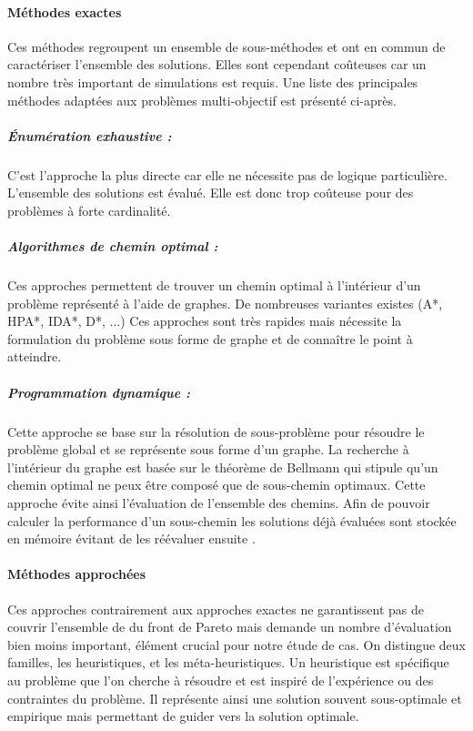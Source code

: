 \paragraph{Méthodes exactes} %
\label{par:methodes_exactes}
Ces méthodes regroupent un ensemble de sous-méthodes et ont en commun de caractériser
l’ensemble des solutions. Elles sont cependant coûteuses car un nombre très important
de simulations est requis. Une liste des principales méthodes adaptées aux problèmes
multi-objectif est présenté ci-après.

\subparagraph{Énumération exhaustive :} %
\label{subp:enumeration_exhaustive}
C’est l’approche la plus directe car elle ne nécessite pas de logique particulière.
L’ensemble des solutions est évalué. Elle est donc trop coûteuse pour des problèmes
à forte cardinalité.

\subparagraph{Algorithmes de chemin optimal :} %
\label{subp:algorithmes_de_chemin_optimal}
Ces approches permettent de trouver un chemin optimal à l’intérieur d’un problème
représenté à l’aide de graphes. De nombreuses variantes existes (A*, HPA*, IDA*, D*, ...)
Ces approches sont très rapides mais nécessite la formulation du problème sous forme
de graphe et de connaître le point à atteindre.


\subparagraph{Programmation dynamique :} %
\label{subp:programmation_dynamique}
Cette approche se base sur la résolution de sous-problème pour résoudre le problème global
et se représente sous forme d’un graphe. La recherche à l’intérieur du graphe est basée sur le théorème
de Bellmann qui stipule qu’un chemin optimal ne peux être composé que de sous-chemin
optimaux.  Cette approche évite ainsi l’évaluation de l’ensemble des chemins. Afin de
pouvoir calculer la performance d’un sous-chemin les solutions déjà évaluées sont
stockée en mémoire évitant de les réévaluer ensuite \parencite{Rivallain2013}.




\paragraph{Méthodes approchées} %
\label{par:methodes_approchees}
Ces approches contrairement aux approches exactes ne garantissent pas de couvrir
l’ensemble de du front de Pareto mais demande un nombre d’évaluation bien moins
important, élément crucial pour notre étude de cas. On distingue deux familles,
les heuristiques, et les méta-heuristiques.
Un heuristique est spécifique au problème que l’on cherche à résoudre et est
inspiré de l’expérience ou des contraintes du problème. Il représente ainsi une
solution souvent sous-optimale et empirique mais permettant de guider vers la solution
optimale.

